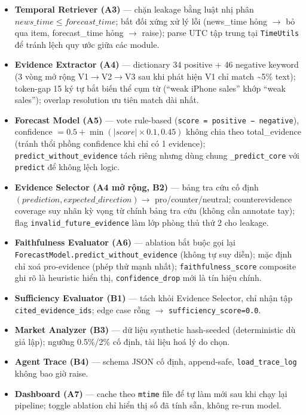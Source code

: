 \begin{itemize}
  \item \textbf{Temporal Retriever (A3)} — chặn leakage bằng luật nhị phân $news\_time \le forecast\_time$; bất đối xứng xử lý lỗi (news\_time hỏng $\to$ bỏ qua item, forecast\_time hỏng $\to$ raise); parse UTC tập trung tại \texttt{TimeUtils} để tránh lệch quy ước giữa các module.
  \item \textbf{Evidence Extractor (A4)} — dictionary 34 positive + 46 negative keyword (3 vòng mở rộng V1$\to$V2$\to$V3 sau khi phát hiện V1 chỉ match \textasciitilde5\% text); token-gap 15 ký tự bắt biến thể cụm từ (``weak iPhone sales'' khớp ``weak sales''); overlap resolution ưu tiên match dài nhất.
  \item \textbf{Forecast Model (A5)} — vote rule-based (\texttt{score = positive − negative}), confidence $=0.5+\min(|score|{\times}0.1, 0.45)$ không chia theo total\_evidence (tránh thổi phồng confidence khi chỉ có 1 evidence); \texttt{predict\_without\_evidence} tách riêng nhưng dùng chung \texttt{\_predict\_core} với \texttt{predict} để không lệch logic.
  \item \textbf{Evidence Selector (A4 mở rộng, B2)} — bảng tra cứu cố định $(prediction, expected\_direction) \to$ pro/counter/neutral; counterevidence coverage suy nhãn kỳ vọng từ chính bảng tra cứu (không cần annotate tay); flag \texttt{invalid\_future\_evidence} làm lớp phòng thủ thứ 2 cho leakage.
  \item \textbf{Faithfulness Evaluator (A6)} — ablation bắt buộc gọi lại \texttt{ForecastModel.predict\_without\_evidence} (không tự suy diễn); mặc định chỉ xoá pro-evidence (phép thử mạnh nhất); \texttt{faithfulness\_score} composite ghi rõ là heuristic hiển thị, \texttt{confidence\_drop} mới là tín hiệu chính.
  \item \textbf{Sufficiency Evaluator (B1)} — tách khỏi Evidence Selector, chỉ nhận tập \texttt{cited\_evidence\_ids}; edge case rỗng $\to$ \texttt{sufficiency\_score=0.0}.
  \item \textbf{Market Analyzer (B3)} — dữ liệu synthetic hash-seeded (deterministic dù giả lập); ngưỡng 0.5\%/2\% cố định, tài liệu hoá lý do chọn.
  \item \textbf{Agent Trace (B4)} — schema JSON cố định, append-safe, \texttt{load\_trace\_log} không bao giờ raise.
  \item \textbf{Dashboard (A7)} — cache theo \texttt{mtime} file để tự làm mới sau khi chạy lại pipeline; toggle ablation chỉ hiển thị số đã tính sẵn, không re-run model.
\end{itemize}


